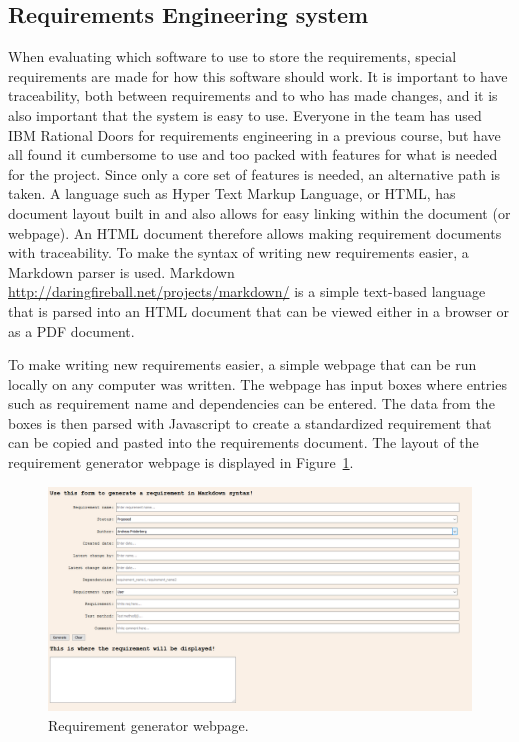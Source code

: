 \subsection{Requirements Engineering system}
When evaluating which software to use to store the requirements,
special requirements are made for how this software should work. It is
important to have traceability, both between requirements and to who has made
changes, and  it is also important that the system is easy to use. 
Everyone in the team has used IBM Rational Doors for requirements
engineering in a previous course, but have all found it cumbersome to use and too
packed with features for what is needed for the project. Since only a core set
of features is
needed, an alternative path is taken. A language such as Hyper Text Markup
Language, or HTML, has document layout built in and also allows for easy linking
within the document (or webpage). An HTML document therefore allows making
requirement documents with
traceability. To make the syntax of writing new requirements easier, a Markdown
parser is used. Markdown \url{http://daringfireball.net/projects/markdown/} is
a simple text-based language that is parsed into an HTML document that can be
viewed either in a browser or as a PDF document. 

To make writing new requirements easier, a simple webpage that can be run
locally on any computer was written. The webpage has input boxes where entries
such as requirement name and dependencies can be entered. The data from the
boxes is then parsed with Javascript to create a standardized requirement that
can be copied and pasted into the requirements document. The layout of the
requirement generator webpage is displayed in Figure~\ref{fig:reqgenerator}.
\begin{figure}[H]
    \centering
    \includegraphics[width=\textwidth]{./img/reqgenerator.png}
    \caption{Requirement generator webpage.}
    \label{fig:reqgenerator}
\end{figure}

